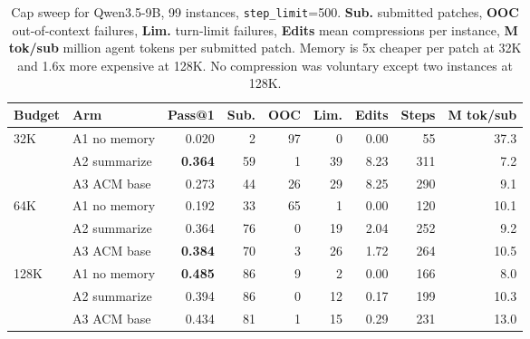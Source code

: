 \begin{table}[t]
\centering
\small
\begin{tabular}{llrrrrrrr}
\toprule
Budget & Arm & Pass@1 & Sub. & OOC & Lim. & Edits & Steps & M tok/sub \\
\midrule
32K & A1 no memory & 0.020 & 2 & 97 & 0 & 0.00 & 55 & 37.3 \\
 & A2 summarize & \textbf{0.364} & 59 & 1 & 39 & 8.23 & 311 & 7.2 \\
 & A3 ACM base & 0.273 & 44 & 26 & 29 & 8.25 & 290 & 9.1 \\
\addlinespace
64K & A1 no memory & 0.192 & 33 & 65 & 1 & 0.00 & 120 & 10.1 \\
 & A2 summarize & 0.364 & 76 & 0 & 19 & 2.04 & 252 & 9.2 \\
 & A3 ACM base & \textbf{0.384} & 70 & 3 & 26 & 1.72 & 264 & 10.5 \\
\addlinespace
128K & A1 no memory & \textbf{0.485} & 86 & 9 & 2 & 0.00 & 166 & 8.0 \\
 & A2 summarize & 0.394 & 86 & 0 & 12 & 0.17 & 199 & 10.3 \\
 & A3 ACM base & 0.434 & 81 & 1 & 15 & 0.29 & 231 & 13.0 \\
\bottomrule
\end{tabular}
\caption{Cap sweep for Qwen3.5-9B, 99 instances, \texttt{step\_limit}=500. \textbf{Sub.} submitted patches, \textbf{OOC} out-of-context failures, \textbf{Lim.} turn-limit failures, \textbf{Edits} mean compressions per instance, \textbf{M tok/sub} million agent tokens per submitted patch. Memory is 5x cheaper per patch at 32K and 1.6x more expensive at 128K. No compression was voluntary except two instances at 128K.}
\label{tab:cap-sweep}
\end{table}
